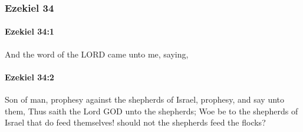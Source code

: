 	\subsubsection{Ezekiel 34} %
		\label{EZEKIEL-34}

		\paragraph{Ezekiel 34:1} %
			\label{EZEKIEL-34-1}

			And the word of the LORD came unto me, saying,


		\paragraph{Ezekiel 34:2} %
			\label{EZEKIEL-34-2}

			Son of man, prophesy against the shepherds of Israel, prophesy, and say unto them, Thus saith the Lord GOD unto the shepherds; Woe be to the shepherds of Israel that do feed themselves! should not the shepherds feed the flocks?


